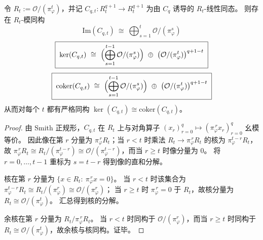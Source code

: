 \begin{conclusion}\label{con:xi-symq-golden-cq-mod-pi-power-kernel-image-cokernel}
令 \(R_t:=\mathcal O/(\pi_\varphi^t)\)，并记 \(C_{q,t}:R_t^{q+1}\to R_t^{q+1}\) 为由 \(C_q\) 诱导的 \(R_t\)-线性同态。
则存在 \(R_t\)-模同构
\[
\boxed{\;
\mathrm{Im}(C_{q,t})\ \cong\ \bigoplus_{s=1}^{t}\mathcal O/(\pi_\varphi^{s})\;}
\]
\[
\boxed{\;
\ker(C_{q,t})\ \cong\ \Bigl(\bigoplus_{s=1}^{t-1}\mathcal O/(\pi_\varphi^{s})\Bigr)\ \oplus\ \bigl(\mathcal O/(\pi_\varphi^{t})\bigr)^{q+1-t}\;}
\]
\[
\boxed{\;
\mathrm{coker}(C_{q,t})\ \cong\ \Bigl(\bigoplus_{s=1}^{t-1}\mathcal O/(\pi_\varphi^{s})\Bigr)\ \oplus\ \bigl(\mathcal O/(\pi_\varphi^{t})\bigr)^{q+1-t}\;}
\]
从而对每个 \(t\) 都有严格同构 \(\ker(C_{q,t})\cong \mathrm{coker}(C_{q,t})\)。
\end{conclusion}
\begin{proof}
由 Smith 正规形，\(C_{q,t}\) 在 \(R_t\) 上与对角算子
\(
(x_r)_{r=0}^{q}\mapsto (\pi_\varphi^{\,r}x_r)_{r=0}^{q}
\)
幺模等价。
因此像在第 \(r\) 分量为 \(\pi_\varphi^{\,r}R_t\)；当 \(r<t\) 时乘法 \(R_t\to\pi_\varphi^{\,r}R_t\) 的核为 \(\pi_\varphi^{t-r}R_t\)，故 \(\pi_\varphi^{\,r}R_t\cong R_t/(\pi_\varphi^{t-r})\cong \mathcal O/(\pi_\varphi^{t-r})\)，而当 \(r\ge t\) 时像分量为 \(0\)。
将 \(r=0,\dots,t-1\) 重标为 \(s=t-r\) 得到像的直和分解。
\par
核在第 \(r\) 分量为 \(\{x\in R_t:\ \pi_\varphi^{\,r}x=0\}\)。
当 \(r<t\) 时该集合为 \(\pi_\varphi^{t-r}R_t\cong R_t/(\pi_\varphi^{r})\cong \mathcal O/(\pi_\varphi^{r})\)；
当 \(r\ge t\) 时 \(\pi_\varphi^{\,r}=0\) 于 \(R_t\)，故核分量为 \(R_t\cong \mathcal O/(\pi_\varphi^{t})\)。
汇总得到核的分解。
\par
余核在第 \(r\) 分量为 \(R_t/\pi_\varphi^{\,r}R_t\)。
当 \(r<t\) 时同构于 \(\mathcal O/(\pi_\varphi^{r})\)，而当 \(r\ge t\) 时同构于 \(R_t\cong \mathcal O/(\pi_\varphi^{t})\)，故余核与核同构。证毕。
\end{proof}

